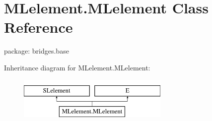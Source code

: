\hypertarget{class_m_lelement_1_1_m_lelement}{}\section{M\+Lelement.\+M\+Lelement Class Reference}
\label{class_m_lelement_1_1_m_lelement}


package\+: bridges.\+base  


Inheritance diagram for M\+Lelement.\+M\+Lelement\+:\begin{figure}[H]
\begin{center}
\leavevmode
\includegraphics[height=2.000000cm]{class_m_lelement_1_1_m_lelement}
\end{center}
\end{figure}

